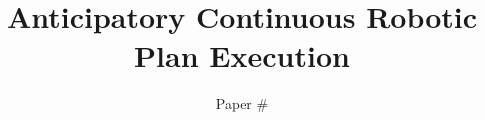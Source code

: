 \documentclass[a4paper]{article}
\begin{document}
\title{Anticipatory Continuous Robotic Plan Execution}
\author{Paper \#}
\maketitle{}

\begin{abstract}

\end{abstract}

%





 
%







\twocolumn 


\end{document}
